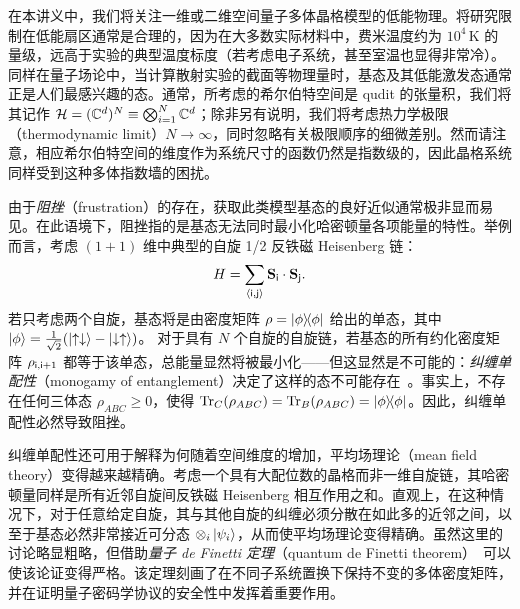 在本讲义中，我们将关注一维或二维空间量子多体晶格模型的低能物理。将研究限制在低能扇区通常是合理的，因为在大多数实际材料中，费米温度约为 $10^4\,\text{K}$ 的量级，远高于实验的典型温度标度（若考虑电子系统，甚至室温也显得非常冷）。同样在量子场论中，当计算散射实验的截面等物理量时，基态及其低能激发态通常正是人们最感兴趣的态。通常，所考虑的希尔伯特空间是 qudit 的张量积，我们将其记作 $\mathcal H=(\mathbb C^d)^N\equiv\bigotimes_{i=1}^N \mathbb C^d$；除非另有说明，我们将考虑热力学极限（thermodynamic limit）$N\rightarrow \infty$，同时忽略有关极限顺序的细微差别。然而请注意，相应希尔伯特空间的维度作为系统尺寸的函数仍然是指数级的，因此晶格系统同样受到这种多体指数墙的困扰。

由于\emph{阻挫}（frustration）的存在，获取此类模型基态的良好近似通常极非显而易见。在此语境下，阻挫指的是基态无法同时最小化哈密顿量各项能量的特性。举例而言，考虑 $(1+1)$ 维中典型的自旋 1/2 反铁磁 Heisenberg 链：
\begin{equation}\label{eq:Heisenberg}
    H = \sum_{\expval{\mathsf i,\mathsf j}} {\bf S}_\mathsf i \cdot {\bf S}_\mathsf j.
\end{equation}
若只考虑两个自旋，基态将是由密度矩阵 $\rho=\ketbra{\phi}$ 给出的单态，其中 $\ket{\phi}=\frac{1}{\sqrt{2}}(\ket{\uparrow\downarrow} - \ket{\downarrow\uparrow})$。
对于具有 $N$ 个自旋的自旋链，若基态的所有约化密度矩阵 $\rho_{\mathsf i,\mathsf i+1}$ 都等于该单态，总能量显然将被最小化——但这显然是不可能的：\emph{纠缠单配性}（monogamy of entanglement）决定了这样的态不可能存在~\cite{Coffman1999,Osborne2006}。事实上，不存在任何三体态 $\rho_{ABC}\geq 0$，使得 $\Tr_C(\rho_{ABC}) = \Tr_B(\rho_{ABC})=\ketbra{\phi}$。因此，纠缠单配性必然导致阻挫。

纠缠单配性还可用于解释为何随着空间维度的增加，平均场理论（mean field theory）变得越来越精确。考虑一个具有大配位数的晶格而非一维自旋链，其哈密顿量同样是所有近邻自旋间反铁磁 Heisenberg 相互作用之和。直观上，在这种情况下，对于任意给定自旋，其与其他自旋的纠缠必须分散在如此多的近邻之间，以至于基态必然非常接近可分态 $\otimes_i \ket{\psi_i}$，从而使平均场理论变得精确。虽然这里的讨论略显粗略，但借助\emph{量子 de Finetti 定理}（quantum de Finetti theorem）~\cite{Raggio1989}可以使该论证变得严格。该定理刻画了在不同子系统置换下保持不变的多体密度矩阵，并在证明量子密码学协议的安全性中发挥着重要作用。

